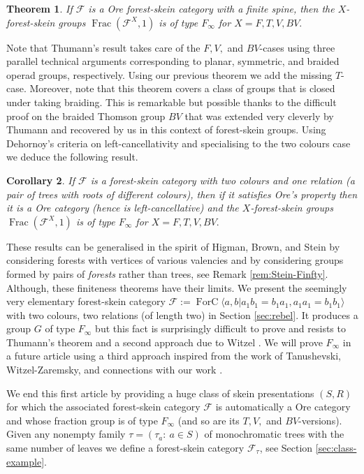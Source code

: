 \documentclass[a4paper, 12pt]{amsart}
\numberwithin{equation}{section}
\newtheorem{lettertheo}{Theorem}
\newtheorem{lettercor}[lettertheo]{Corollary}
\theoremstyle{definition}
\newcommand{\cF}{\mathcal F}
\DeclareMathOperator{\Frac}{Frac}
\DeclareMathOperator{\FC}{ForC}
\newcommand{\la}{\langle}
\newcommand{\ra}{\rangle}
\begin{document}
\begin{lettertheo}\label{ltheo:Finfty}
If $\cF$ is a Ore forest-skein category with a finite spine, then the $X$-forest-skein groups $\Frac(\cF^X,1)$ is of type $F_\infty$ for $X=F,T,V,BV.$
\end{lettertheo}

Note that Thumann's result takes care of the $F,V,$ and $BV$-cases using three parallel technical arguments corresponding to planar, symmetric, and braided operad groups, respectively.
Using our previous theorem we add the missing $T$-case.
Moreover, note that this theorem covers a class of groups that is closed under taking braiding. 
This is remarkable but possible thanks to the difficult proof on the braided Thomson group $BV$ \cite{Bux-Fluch-Marschler-Witzel-Zaremsky16} that was extended very cleverly by Thumann and recovered by us in this context of forest-skein groups.
%
Using Dehornoy's criteria on left-cancellativity and specialising to the two colours case we deduce the following result.

\begin{lettercor}
If $\cF$ is a forest-skein category with two colours and one relation (a pair of trees with roots of different colours), then if it satisfies Ore's property then it is a Ore category (hence is left-cancellative) and the $X$-forest-skein groups $\Frac(\cF^X,1)$ is of type $F_\infty$ for $X=F,T,V,BV.$
\end{lettercor}

These results can be generalised in the spirit of Higman, Brown, and Stein by considering forests with vertices of various valencies and by considering groups formed by pairs of {\it forests} rather than trees, see Remark \ref{rem:Stein-Finfty}.
Although, these finiteness theorems have their limits. 
We present the seemingly very elementary forest-skein category $\cF:=\FC\la a,b| a_1b_1=b_1a_1, a_1a_1=b_1b_1\ra$ with two colours, two relations (of length two) in Section \ref{sec:rebel}. 
It produces a group $G$ of type $F_\infty$ but this fact is surprisingly difficult to prove and resists to Thumann's theorem and a second approach due to Witzel \cite{Witzel19}. We will prove $F_\infty$ in a future article using a third approach inspired from the work of Tanushevski, Witzel-Zaremsky, and connections with our work \cite{Tanushevski16,Witzel-Zaremsky18,Brothier22-HPM}.

We end this first article by providing a huge class of skein presentations $(S,R)$ for which the associated forest-skein category $\cF$ is automatically a Ore category and whose fraction group is of type $F_\infty$ (and so are its $T,V,$ and $BV$-versions).
Given any nonempty family $\tau=(\tau_a:\ a\in S)$ of monochromatic trees with the same number of leaves we define a forest-skein category $\cF_\tau$, see Section \ref{sec:class-example}.
\end{document}
